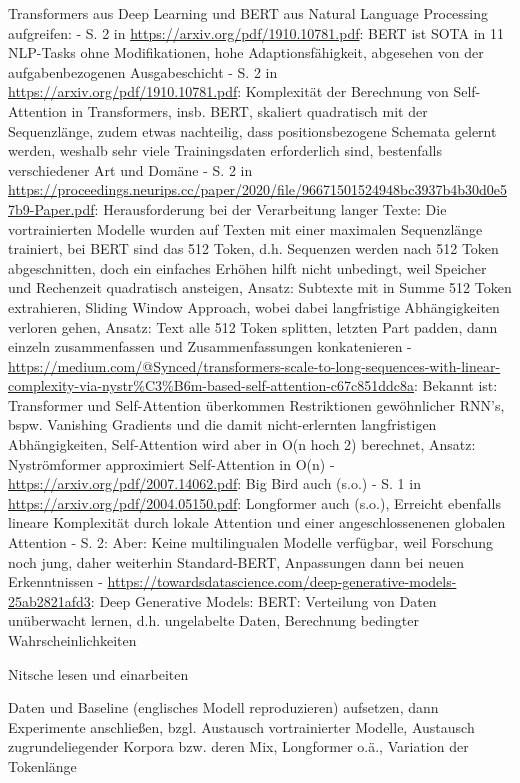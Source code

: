 Transformers aus Deep Learning und BERT aus Natural Language Processing aufgreifen:
- S. 2 in \url{https://arxiv.org/pdf/1910.10781.pdf}:
  BERT ist SOTA in 11 NLP-Tasks ohne Modifikationen, hohe Adaptionsfähigkeit,
  abgesehen von der aufgabenbezogenen Ausgabeschicht
- S. 2 in \url{https://arxiv.org/pdf/1910.10781.pdf}:
  Komplexität der Berechnung von Self-Attention in Transformers, insb. BERT,
  skaliert quadratisch mit der Sequenzlänge,
  zudem etwas nachteilig, dass positionsbezogene Schemata gelernt werden,
  weshalb sehr viele Trainingsdaten erforderlich sind, bestenfalls verschiedener Art und Domäne
- S. 2 in \url{https://proceedings.neurips.cc/paper/2020/file/96671501524948bc3937b4b30d0e57b9-Paper.pdf}:
  Herausforderung bei der Verarbeitung langer Texte:
  Die vortrainierten Modelle wurden auf Texten mit einer maximalen Sequenzlänge trainiert,
  bei BERT sind das 512 Token, d.h. Sequenzen werden nach 512 Token abgeschnitten,
  doch ein einfaches Erhöhen hilft nicht unbedingt, weil Speicher und Rechenzeit quadratisch ansteigen,
  Ansatz: Subtexte mit in Summe 512 Token extrahieren, Sliding Window Approach,
  wobei dabei langfristige Abhängigkeiten verloren gehen,
  Ansatz: Text alle 512 Token splitten, letzten Part padden,
  dann einzeln zusammenfassen und Zusammenfassungen konkatenieren
- \url{https://medium.com/@Synced/transformers-scale-to-long-sequences-with-linear-complexity-via-nystr\%C3\%B6m-based-self-attention-c67c851ddc8a}:
  Bekannt ist: Transformer und Self-Attention überkommen Restriktionen gewöhnlicher RNN's, bspw. Vanishing Gradients
  und die damit nicht-erlernten langfristigen Abhängigkeiten, Self-Attention wird aber in O(n hoch 2) berechnet,
  Ansatz: Nyströmformer approximiert Self-Attention in O(n)
- \url{https://arxiv.org/pdf/2007.14062.pdf}: Big Bird auch (s.o.)
- S. 1 in \url{https://arxiv.org/pdf/2004.05150.pdf}: Longformer auch (s.o.),
  Erreicht ebenfalls lineare Komplexität durch lokale Attention und einer
  angeschlossenenen globalen Attention
- S. 2: Aber: Keine multilingualen Modelle verfügbar, weil Forschung noch jung,
  daher weiterhin Standard-BERT, Anpassungen dann bei neuen Erkenntnissen
- \url{https://towardsdatascience.com/deep-generative-models-25ab2821afd3}:
  Deep Generative Models: BERT: Verteilung von Daten unüberwacht lernen,
  d.h. ungelabelte Daten, Berechnung bedingter Wahrscheinlichkeiten

Nitsche lesen und einarbeiten

Daten und Baseline (englisches Modell reproduzieren) aufsetzen, dann Experimente anschließen, bzgl. Austausch vortrainierter Modelle, Austausch zugrundeliegender Korpora bzw. deren Mix, Longformer o.ä., Variation der Tokenlänge

